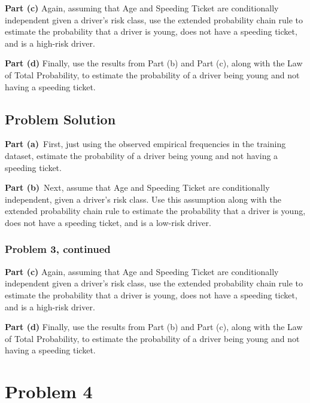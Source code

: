 \documentclass[12pt]{article}
\theoremstyle{definition}
\begin{document}
\bigskip
\noindent
{\bf Part (c)} Again, assuming that Age and Speeding Ticket are conditionally independent given a driver's risk class, use the extended probability chain rule to estimate the probability that a driver is young, does not have a speeding ticket, and is a high-risk driver.

\bigskip
\noindent
{\bf Part (d)} Finally, use the results from Part (b) and Part (c), along with the Law of Total Probability, to estimate the probability of a driver being young and not having a speeding ticket.

\newpage
\subsection*{Problem Solution}

\bigskip
\noindent
{\bf Part (a)}\ First, just using the observed empirical frequencies in the training dataset, estimate the probability of a driver being young and not having a speeding ticket.

\vspace{2in}
\noindent
{\bf Part (b)}\ Next, assume that Age and Speeding Ticket are conditionally independent, given a driver's risk class. Use this assumption along with the extended probability chain rule to estimate the probability that a driver is young, does not have a speeding ticket, and is a low-risk driver.

\newpage
\subsubsection*{Problem 3, continued}

\bigskip
\noindent
{\bf Part (c)} Again, assuming that Age and Speeding Ticket are conditionally independent given a driver's risk class, use the extended probability chain rule to estimate the probability that a driver is young, does not have a speeding ticket, and is a high-risk driver.

\vspace{3.5in}
\noindent
{\bf Part (d)} Finally, use the results from Part (b) and Part (c), along with the Law of Total Probability, to estimate the probability of a driver being young and not having a speeding ticket.



\newpage
\section*{Problem 4}
\end{document}

